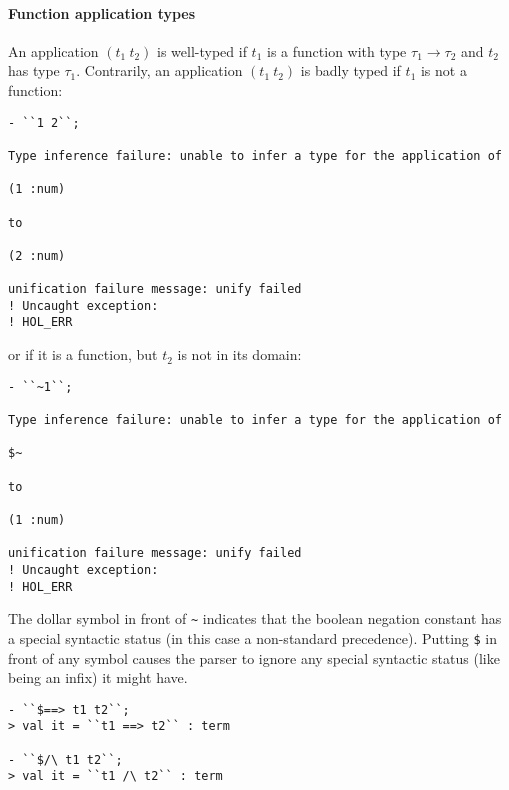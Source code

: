 \paragraph{Function application types}

An application $(t_1\ t_2)$ is well-typed if $t_1$ is a function 
with type $\tau_1 \to \tau_2$ and $t_2$ has type $\tau_1$. Contrarily,
an application $(t_1\ t_2)$ is badly typed if $t_1$ is not a function:

\begin{session}\begin{verbatim}
- ``1 2``;

Type inference failure: unable to infer a type for the application of

(1 :num)

to

(2 :num)

unification failure message: unify failed
! Uncaught exception:
! HOL_ERR \end{verbatim}\end{session}

\noindent or if it is a function, but $t_2$ is not in its domain:

\begin{session}\begin{verbatim}
- ``~1``;

Type inference failure: unable to infer a type for the application of

$~

to

(1 :num)

unification failure message: unify failed
! Uncaught exception:
! HOL_ERR 
\end{verbatim}\end{session}

The dollar symbol in front of {\small\verb|~|} indicates that the
boolean negation constant has a special syntactic status (in this case a
non-standard precedence). Putting {\small\verb|$|} in front of any
symbol causes the parser to ignore any special syntactic status (like
being an infix) it might have.

\begin{session}\begin{verbatim}
- ``$==> t1 t2``;
> val it = ``t1 ==> t2`` : term

- ``$/\ t1 t2``;
> val it = ``t1 /\ t2`` : term
\end{verbatim}\end{session}

